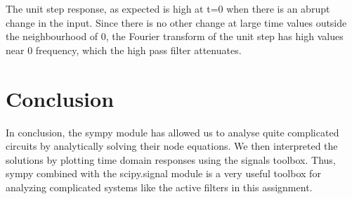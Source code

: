 \documentclass[11pt, a4paper]{article}
\begin{document}
The unit step response, as expected is high at t=0 when there is an abrupt
change in the input. Since there is no other change at large time values outside
the neighbourhood of 0, the Fourier transform of the unit step has high values
near 0 frequency, which the high pass filter attenuates.

\section*{Conclusion}
In conclusion, the sympy module has allowed us to analyse quite complicated circuits by analytically solving their node equations. We then interpreted the solutions by plotting time domain responses using the signals toolbox. Thus, sympy combined with the scipy.signal module is a very useful toolbox for analyzing complicated systems like the active filters in this assignment.
\end{document}
